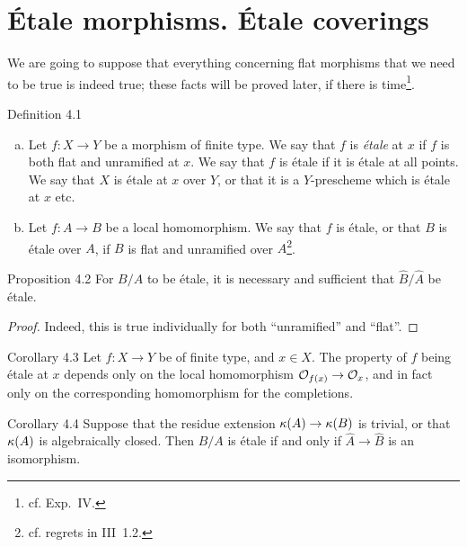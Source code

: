 \section{\'{E}tale morphisms. \'{E}tale coverings}
\label{I.4}

We are going to suppose that everything concerning flat morphisms that we need to be true is indeed true;
these facts will be proved later, if there is time\footnote{cf. Exp.~IV.}.

\begin{rmenv}{Definition 4.1}
  \begin{enumerate}[(a)]
    \item Let $f\colon X\to Y$ be a morphism of finite type.
      We say that $f$ is \emph{\'{e}tale} at $x$ if $f$ is both flat and unramified at $x$.
      We say that $f$ is \'{e}tale if it is \'{e}tale at all points.
      We say that $X$ is \'{e}tale at $x$ over $Y$, or that it is a $Y$-prescheme which is \'{e}tale at $x$ etc.
    \item Let $f\colon A\to B$ be a local homomorphism.
      We say that $f$ is \'{e}tale, or that $B$ is \'{e}tale over $A$, if $B$ is flat and unramified over $A$\footnote{cf. regrets in III~1.2.}.
  \end{enumerate}
\end{rmenv}

\begin{itenv}{Proposition 4.2}
  For $B/A$ to be \'{e}tale, it is necessary and sufficient that $\hat{B}/\hat{A}$ be \'{e}tale.
\end{itenv}

\begin{proof}
  Indeed, this is true individually for both ``unramified'' and ``flat''.
\end{proof}

\begin{itenv}{Corollary 4.3}
  Let $f\colon X\to Y$ be of finite type, and $x\in X$.
  The property of $f$ being \'{e}tale at $x$ depends only on the local homomorphism $\cal{O}_{f(x)}\to\cal{O}_x$, and in fact only on the corresponding homomorphism for the completions.
\end{itenv}

\begin{itenv}{Corollary 4.4}
  Suppose that the residue extension $\kres(A)\to\kres(B)$ is trivial, or that $\kres(A)$ is algebraically closed.
  Then $B/A$ is \'{e}tale if and only if $\hat{A}\to\hat{B}$ is an isomorphism.
\end{itenv}

